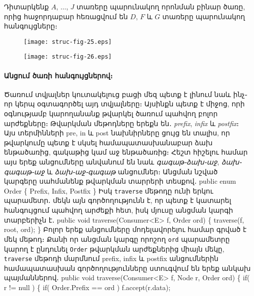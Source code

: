 Դիտարկենք \(A\), \(\ldots\), \(J\) տառերը պարունակող որոնման 
բինար ծառը, որից հաջորդաբար հեռացվում են \(D\), \(F\) և 
\(G\) տառերը պարունակող հանգույցները։ 
\begin{figure}[h]
\centering
\texttt{[image: struc-fig-25.eps]}
\end{figure}

\begin{figure}[h]
\centering
\texttt{[image: struc-fig-26.eps]}
\end{figure}



%
%
\paragraph{Անցում ծառի հանգույցներով։}
Ծառում տվյալներ կուտակելուց բացի մեզ պետք է լինում նաև 
ինչ֊որ կերպ օգտագործել այդ տվյալները։ Այսինքն պետք է 
միջոց, որի օգնությամբ կարողանանք թվարկել ծառում պահվող 
բոլոր արժեքները։ Թվարկման մեթոդները երեքն են․ \emph{prefix}, 
\emph{infix} և \emph{postfix}։ Այս տերմինների pre, in և 
post նախնիրները ցույց են տալիս, որ թվարկումը պետք է սկսել 
համապատասխանաբար ձախ ենթածառից, գակաթից կամ աջ ենթածառից։ 
Հեշտ հիշելու համար այս երեք անցումները անվանում են նաև 
\emph{գագաթ֊ձախ֊աջ}, \emph{ձախ֊գագաթ֊աջ} և 
\emph{ձախ֊աջ֊գագաթ} անցումներ։ Անցման նշված կարգերը 
սահմանենք թվարկման տարրերի տեսքով․
\nwenddocs{}\endmoddef{}
public enum Order \{ Prefix, Infix, Postfix \}
\nwendcode{}\nwdocspar
Իսկ \texttt{traverse} մեթոդը ունի երկու պարամետր․ մեկն 
այն գործողությունն է, որ պետք է կատարել հանգույցում 
պահվող արժեքի հետ, իսկ մյուսը անցման կարգի տարբերիչն է․
\nwenddocs{}\plusendmoddef
public void traverse(Consumer<E> f, Order ord)
\{
  traverse(f, root, ord);
\}
\nwendcode{}\nwdocspar
Բոլոր երեք անցումները մոդելավորելու համար գրված է մեկ 
մեթոդ։ Քանի որ անցման կարգը որոշող \texttt{ord} պարամետրը 
կարող է ընդունել \texttt{Order} թվարկման արժեքներից միայն 
մեկը, \texttt{traverse} մեթոդի մարմնում prefix, infix և 
postfix անցումներին համապատասխան գործողությունները 
ստուգվում են երեք անկախ պայմաններով․
\nwenddocs{}\plusendmoddef
public void traverse(Consumer<E> f, Node r, Order ord)
\{
  if( r != null ) \{
    if( Order.Prefix == ord )
      f.accept(r.data);

